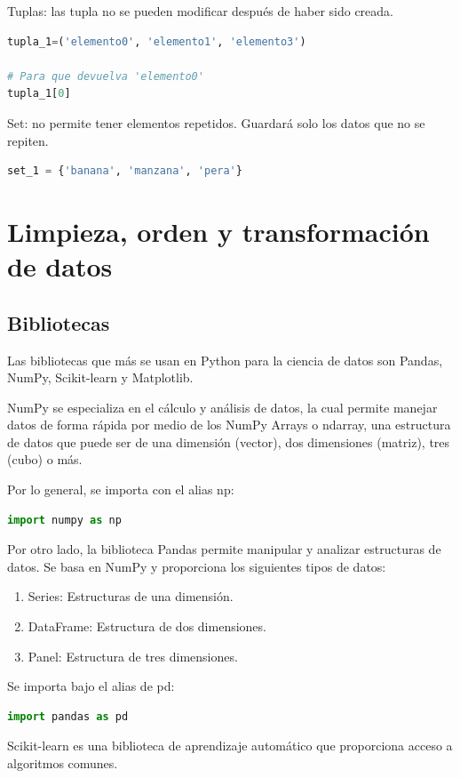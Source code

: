 \documentclass[a4paper, 12pt]{book}
\begin{document}
Tuplas: las tupla no se pueden modificar después de haber sido creada.
\begin{lstlisting}[language=Python]
tupla_1=('elemento0', 'elemento1', 'elemento3')
	
# Para que devuelva 'elemento0'
tupla_1[0]
\end{lstlisting}

Set: no permite tener elementos repetidos. Guardará solo los datos que no se repiten.
\begin{lstlisting}[language=Python]
set_1 = {'banana', 'manzana', 'pera'}
\end{lstlisting}

\section{Limpieza, orden y transformación de datos}

\subsection{Bibliotecas}
Las bibliotecas que más se usan en Python para la ciencia de datos son Pandas, NumPy, Scikit-learn y Matplotlib.

NumPy se especializa en el cálculo y análisis de datos, la cual permite manejar datos de forma rápida por medio de los NumPy Arrays o ndarray, una estructura de datos que puede ser de una dimensión (vector), dos dimensiones (matriz), tres (cubo) o más.

Por lo general, se importa con el alias np:
\begin{lstlisting}[language=Python]
import numpy as np
\end{lstlisting}
Por otro lado, la biblioteca Pandas permite manipular y analizar estructuras de datos. Se basa en NumPy y proporciona los siguientes tipos de datos:
\begin{enumerate}
	\item Series: Estructuras de una dimensión.
	\item DataFrame: Estructura de dos dimensiones.
	\item Panel: Estructura de tres dimensiones.
\end{enumerate}
Se importa bajo el alias de pd:
\begin{lstlisting}[language=Python]
import pandas as pd
\end{lstlisting}


Scikit-learn es una biblioteca de aprendizaje automático que proporciona acceso a algoritmos comunes.
\\
\end{document}
